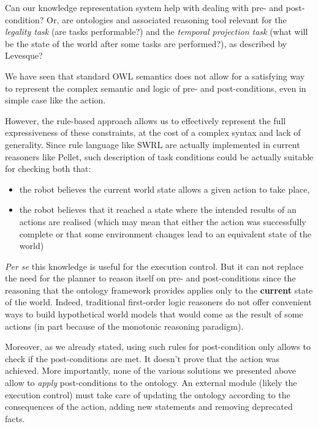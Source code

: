 Can our knowledge representation system help with dealing with pre- and
post-condition? Or, are ontologies and associated reasoning tool relevant for
the \emph{legality task} (are tasks performable?) and the \emph{temporal
projection task} (what will be the state of the world after some tasks are
performed?), as described by Levesque?

We have seen that standard OWL semantics does not allow for a satisfying way to
represent the complex semantic and logic of pre- and post-conditions, even in
simple case like the  action.

However, the rule-based approach allows us to effectively represent the full
expressiveness of these constraints, at the cost of a complex syntax and lack
of generality. Since rule language like SWRL are actually implemented in
current reasoners like Pellet, such description of task conditions could be
actually suitable for checking both that:

\begin{itemize}

    \item  the robot believes the current world state allows a given action to
    take place,

    \item  the robot believes that it reached a state where the intended
    results of an actions are realised (which may mean that either the action
    was successfully complete or that some environment changes lead to an
    equivalent state of the world)

\end{itemize}

{\it Per se} this knowledge is useful for the execution control. But it can not
replace the need for the planner to reason itself on pre- and post-conditions
since the reasoning that the ontology framework provides applies only to the
{\bf current} state of the world. Indeed, traditional first-order logic
reasoners do not offer convenient ways to build hypothetical world models
that would come as the result of some actions (in part because of the monotonic reasoning
paradigm).

Moreover, as we already stated, using such rules for post-condition only allows
to check if the post-conditions are met. It doesn't prove that the action was
achieved. More importantly, none of the various solutions we presented
above allow to \emph{apply} post-conditions to the ontology. An external module
(likely the execution control) must take care of updating the ontology according to
the consequences of the action, adding new statements and removing deprecated
facts.

